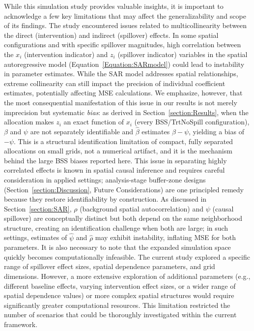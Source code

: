 \documentclass{article}[11pt]
\begin{document}
While this simulation study provides valuable insights, it is important to acknowledge a few key limitations that may affect the generalizability and scope of its findings. The study encountered issues related to multicollinearity between the direct (intervention) and indirect (spillover) effects. In some spatial configurations and with specific spillover magnitudes, high correlation between the $x_i$ (intervention indicator) and $z_i$ (spillover indicator) variables in the spatial autoregressive model (Equation~\ref{Equation:SARmodel}) could lead to instability in parameter estimates. While the SAR model addresses spatial relationships, extreme collinearity can still impact the precision of individual coefficient estimates, potentially affecting MSE calculations. We emphasize, however, that the most consequential manifestation of this issue in our results is not merely imprecision but systematic \emph{bias}: as derived in Section~\ref{section:Results}, when the allocation makes $z_i$ an exact function of $x_i$ (every BSS/TrtNoSpill configuration), $\beta$ and $\psi$ are not separately identifiable and $\hat{\beta}$ estimates $\beta - \psi$, yielding a bias of $-\psi$. This is a structural identification limitation of compact, fully separated allocations on small grids, not a numerical artifact, and it is the mechanism behind the large BSS biases reported here. This issue in separating highly correlated effects is known in spatial causal inference and requires careful consideration in applied settings; analysis-stage buffer-zone designs (Section~\ref{section:Discussion}, Future Considerations) are one principled remedy because they restore identifiability by construction. As discussed in Section~\ref{section:SAR}, $\rho$ (background spatial autocorrelation) and $\psi$ (causal spillover) are conceptually distinct but both depend on the same neighborhood structure, creating an identification challenge when both are large; in such settings, estimates of $\hat{\psi}$ and $\hat{\rho}$ may exhibit instability, inflating MSE for both parameters. It is also necessary to note that the expanded simulation space quickly becomes computationally infeasible. The current study explored a specific range of spillover effect sizes, spatial dependence parameters, and grid dimensions. However, a more extensive exploration of additional parameters (e.g., different baseline effects, varying intervention effect sizes, or a wider range of spatial dependence values) or more complex spatial structures would require significantly greater computational resources. This limitation restricted the number of scenarios that could be thoroughly investigated within the current framework.
\end{document}
